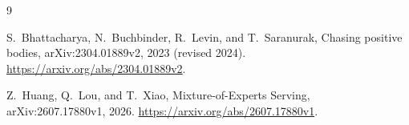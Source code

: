 \documentclass[11pt]{article}
\theoremstyle{remark}
\begin{document}
\begin{thebibliography}{9}

S.~Bhattacharya, N.~Buchbinder, R.~Levin, and T.~Saranurak,
\newblock Chasing positive bodies,
\newblock arXiv:2304.01889v2, 2023 (revised 2024).
\newblock \url{https://arxiv.org/abs/2304.01889v2}.

Z.~Huang, Q.~Lou, and T.~Xiao,
\newblock Mixture-of-Experts Serving,
\newblock arXiv:2607.17880v1, 2026.
\newblock \url{https://arxiv.org/abs/2607.17880v1}.

\end{thebibliography}
\end{document}
